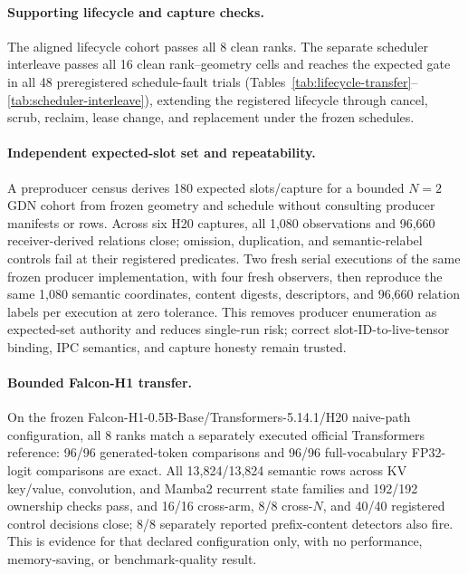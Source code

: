 \documentclass{article}
\begin{document}


\paragraph{Supporting lifecycle and capture checks.}

The aligned lifecycle cohort passes all 8 clean ranks.  The separate scheduler
interleave passes all 16 clean rank--geometry cells and reaches the expected
gate in all 48 preregistered schedule-fault trials
(Tables~\ref{tab:lifecycle-transfer}--\ref{tab:scheduler-interleave}), extending
the registered lifecycle through cancel, scrub, reclaim, lease change, and
replacement under the frozen schedules.

\paragraph{Independent expected-slot set and repeatability.}
A preproducer census derives 180 expected slots/capture for a bounded $N=2$ GDN
cohort from frozen geometry and schedule without consulting producer manifests
or rows.  Across six H20 captures, all 1,080 observations and 96,660
receiver-derived relations close; omission, duplication, and semantic-relabel
controls fail at their registered predicates.  Two fresh serial executions of
the same frozen producer implementation, with four fresh observers, then
reproduce the same 1,080 semantic coordinates, content digests, descriptors, and
96,660 relation labels per execution at zero tolerance.  This removes producer
enumeration as expected-set authority and reduces single-run risk; correct
slot-ID-to-live-tensor binding, IPC semantics, and capture honesty remain trusted.

\paragraph{Bounded Falcon-H1 transfer.}
On the frozen Falcon-H1-0.5B-Base/Transformers-5.14.1/H20 naive-path
configuration, all 8 ranks match a separately executed official Transformers
reference: 96/96 generated-token comparisons
and 96/96 full-vocabulary FP32-logit comparisons are exact.  All
13,824/13,824 semantic rows across KV key/value, convolution, and Mamba2
recurrent state families and 192/192 ownership checks pass, and
16/16 cross-arm, 8/8 cross-$N$, and 40/40 registered control decisions close;
8/8 separately reported prefix-content detectors also fire.  This is evidence
for that declared configuration only, with no performance, memory-saving, or
benchmark-quality result.
\end{document}
